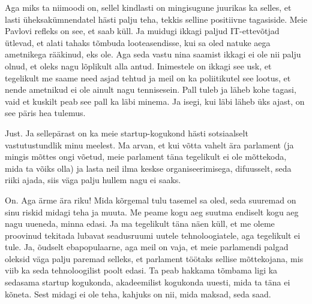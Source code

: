 Aga miks ta niimoodi on, sellel kindlasti on mingisugune juurikas ka selles, et 
lasti üheksakümnendatel hästi palju teha, tekkis selline positiivne tagasiside. 
Meie Pavlovi refleks on see, et saab küll. Ja muidugi ikkagi  paljud 
IT-ettevõtjad ütlevad, et alati tahaks tõmbuda looteasendisse, kui sa oled 
natuke aega ametnikega rääkinud, eks ole. Aga seda vastu nina saamist ikkagi ei 
ole nii palju olnud, et oleks nagu lõplikult alla antud. Inimestele on ikkagi 
see usk, et tegelikult me saame need asjad tehtud ja meil on ka poliitikutel 
see lootus, et nende ametnikud ei ole ainult nagu tennisesein. Pall tuleb ja 
läheb kohe tagasi, vaid et kuskilt peab see pall ka läbi minema. Ja isegi, kui 
läbi läheb üks ajast, on see päris hea tulemus.



Just. Ja sellepärast on ka meie startup-kogukond hästi sotsiaalselt 
vastutustundlik minu meelest. Ma arvan, et  kui võtta vahelt ära parlament (ja 
mingis mõttes ongi võetud, meie parlament täna tegelikult ei ole mõttekoda, 
mida ta võiks olla) ja  lasta neil ilma keskse organiseerimisega, difuusselt, 
seda riiki ajada, siis väga palju hullem nagu ei saaks.


On. Aga ärme ära riku! Mida kõrgemal tulu tasemel sa oled, seda suuremad on 
sinu riskid midagi teha ja muuta. Me peame  kogu aeg suutma endiselt kogu aeg 
nagu uueneda, minna edasi. Ja ma tegelikult täna näen küll, et me oleme 
proovinud tekitada lubavat seadusruumi uutele tehnoloogiatele, aga tegelikult 
ei tule. Ja, õudselt ebapopulaarne, aga meil on vaja, et meie parlamendi palgad 
oleksid väga palju paremad selleks, et parlament töötaks sellise  mõttekojana, 
mis viib ka seda tehnoloogilist poolt edasi. Ta peab hakkama tõmbama ligi ka 
sedasama startup kogukonda, akadeemilist kogukonda uuesti, mida ta täna ei 
kõneta. Sest midagi ei ole teha, kahjuks on nii, mida maksad, seda saad.